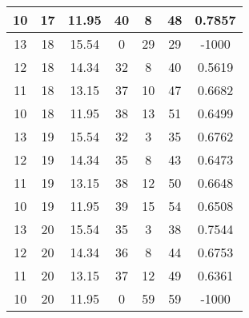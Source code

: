 \documentclass[letterpaper, 12pt]{article}
\begin{document}
\begin{longtable}{|c|c|c|c|c|c|c|}
\hline
10 & 17 & 11.95 & 40 & 8 & 48 & 0.7857 \\
\hline
13 & 18 & 15.54 & 0 & 29 & 29 & -1000 \\
\hline
12 & 18 & 14.34 & 32 & 8 & 40 & 0.5619 \\
\hline
11 & 18 & 13.15 & 37 & 10 & 47 & 0.6682 \\
\hline
10 & 18 & 11.95 & 38 & 13 & 51 & 0.6499 \\
\hline
13 & 19 & 15.54 & 32 & 3 & 35 & 0.6762 \\
\hline
12 & 19 & 14.34 & 35 & 8 & 43 & 0.6473 \\
\hline
11 & 19 & 13.15 & 38 & 12 & 50 & 0.6648 \\
\hline
10 & 19 & 11.95 & 39 & 15 & 54 & 0.6508 \\
\hline
13 & 20 & 15.54 & 35 & 3 & 38 & 0.7544 \\
\hline
12 & 20 & 14.34 & 36 & 8 & 44 & 0.6753 \\
\hline
11 & 20 & 13.15 & 37 & 12 & 49 & 0.6361 \\
\hline
10 & 20 & 11.95 & 0 & 59 & 59 & -1000 \\
\hline
\end{longtable}
\end{document}

